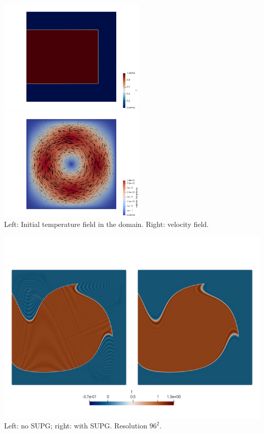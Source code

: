 \begin{center}
\includegraphics[width=7cm]{python_codes/fieldstone_43/results/experiment7/T}
\includegraphics[width=7cm]{python_codes/fieldstone_43/results/experiment7/vel}\\
{\captionfont Left: Initial temperature field in the domain. Right: velocity field.}
\end{center}

\begin{center}
\includegraphics[width=14cm]{python_codes/fieldstone_43/results/experiment7/T96}\\
{\captionfont Left: no SUPG; right: with SUPG. Resolution $96^2$.}
\end{center}

